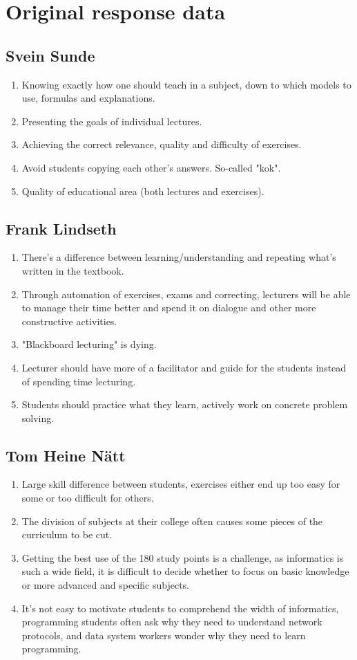 \appendix
\section{Original response data}
\subsection{Svein Sunde}
\begin{enumerate}
    \item Knowing exactly how one should teach in a subject, down to which models to use, formulas and explanations.
    \item Presenting the goals of individual lectures.
    \item Achieving the correct relevance, quality and difficulty of exercises.
    \item Avoid students copying each other's answers. So-called "kok".
    \item Quality of educational area (both lectures and exercises).
\end{enumerate}

\subsection{Frank Lindseth}
\begin{enumerate}
    \item There's a difference between learning/understanding and repeating what's written in the textbook.
    \item Through automation of exercises, exams and correcting, lecturers will be able to manage their time better and spend it on dialogue and other more constructive activities.
    \item "Blackboard lecturing" is dying.
    \item Lecturer should have more of a facilitator and guide for the students instead of spending time lecturing.
    \item Students should practice what they learn, actively work on concrete problem solving.
\end{enumerate}

\subsection{Tom Heine Nätt} 
\begin{enumerate}    
    \item Large skill difference between students, exercises either end up too easy for some or too difficult for others.
    \item The division of subjects at their college often causes some pieces of the curriculum to be cut.
    \item Getting the best use of the 180 study points is a challenge, as informatics is such a wide field, it is difficult to decide whether to focus on basic knowledge or more advanced and specific subjects.
    \item It's not easy to motivate students to comprehend the width of informatics, programming students often ask why they need to understand network protocols, and data system workers wonder why they need to learn programming.
\end{enumerate}